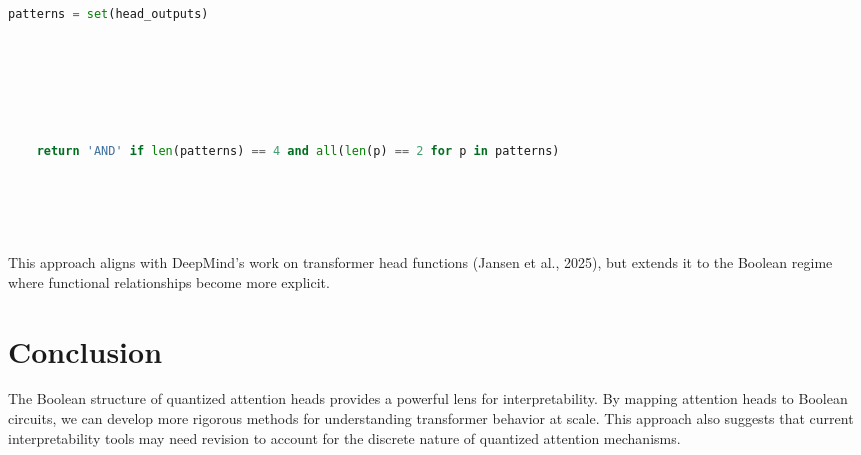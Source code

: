\documentclass[11pt]{article}
\theoremstyle{definition}
\begin{document}
\begin{thebibliography}{9}
{{{\begin{lstlisting}[language=python]
    patterns = set(head_outputs)






    return 'AND' if len(patterns) == 4 and all(len(p) == 2 for p in patterns)






\end{lstlisting}













This approach aligns with DeepMind's work on transformer head functions (Jansen et al., 2025), but extends it to the Boolean regime where functional relationships become more explicit.













\section{Conclusion}






The Boolean structure of quantized attention heads provides a powerful lens for interpretability. By mapping attention heads to Boolean circuits, we can develop more rigorous methods for understanding transformer behavior at scale. This approach also suggests that current interpretability tools may need revision to account for the discrete nature of quantized attention mechanisms.































}}}
\end{thebibliography}
\end{document}
